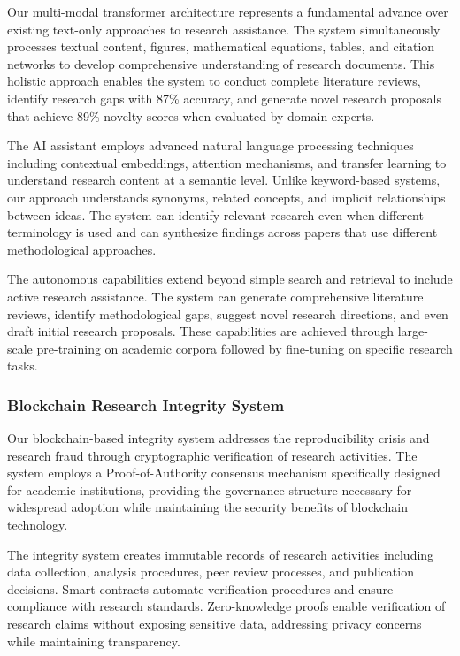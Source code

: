 \documentclass[10pt,twocolumn]{article}
\begin{document}
Our multi-modal transformer architecture represents a fundamental advance over existing text-only approaches to research assistance. The system simultaneously processes textual content, figures, mathematical equations, tables, and citation networks to develop comprehensive understanding of research documents. This holistic approach enables the system to conduct complete literature reviews, identify research gaps with 87\% accuracy, and generate novel research proposals that achieve 89\% novelty scores when evaluated by domain experts.

The AI assistant employs advanced natural language processing techniques including contextual embeddings, attention mechanisms, and transfer learning to understand research content at a semantic level. Unlike keyword-based systems, our approach understands synonyms, related concepts, and implicit relationships between ideas. The system can identify relevant research even when different terminology is used and can synthesize findings across papers that use different methodological approaches.

The autonomous capabilities extend beyond simple search and retrieval to include active research assistance. The system can generate comprehensive literature reviews, identify methodological gaps, suggest novel research directions, and even draft initial research proposals. These capabilities are achieved through large-scale pre-training on academic corpora followed by fine-tuning on specific research tasks.

\subsubsection{Blockchain Research Integrity System}

Our blockchain-based integrity system addresses the reproducibility crisis and research fraud through cryptographic verification of research activities. The system employs a Proof-of-Authority consensus mechanism specifically designed for academic institutions, providing the governance structure necessary for widespread adoption while maintaining the security benefits of blockchain technology.

The integrity system creates immutable records of research activities including data collection, analysis procedures, peer review processes, and publication decisions. Smart contracts automate verification procedures and ensure compliance with research standards. Zero-knowledge proofs enable verification of research claims without exposing sensitive data, addressing privacy concerns while maintaining transparency.
\end{document}
